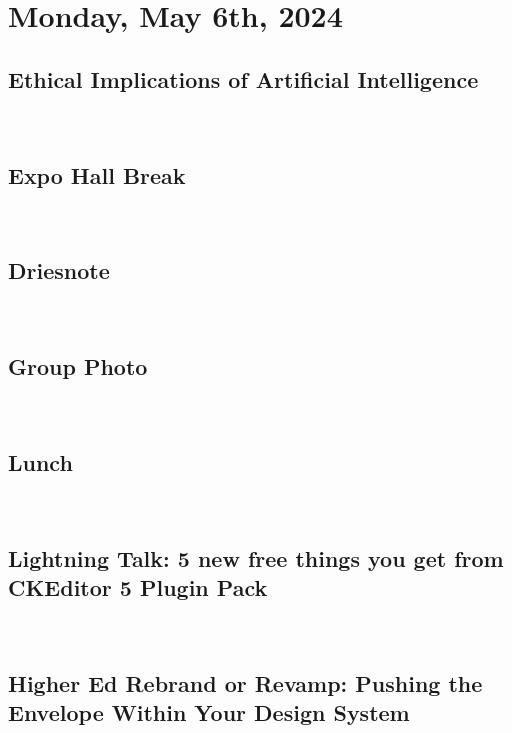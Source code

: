 \section{Monday, May 6th, 2024}\label{sec:day1}

\subsection[09:00-09:50 Ethical Implications of Artificial Intelligence]{Ethical Implications of Artificial Intelligence}\label{subsec:session1}
 \\

\subsection[09:50-10:30: Expo Hall Break]{Expo Hall Break}\label{subsec:breakd1b1}
 \\

\subsection[10:45-11:45: Driesnote]{Driesnote}\label{subsec:driesnote}
 \\

\subsection[11:45-12:00: Group Photo]{Group Photo}\label{subsec:groupphoto}
 \\

\subsection[12:00-13:00: Lunch]{Lunch}\label{subsec:lunchd1}
 \\

\subsection[13:05-13:15: Lighning Talk 5 new free things you get from CKEditor 5 Plugin Pack]{Lightning Talk: 5 new free things you get from CKEditor 5 Plugin Pack}\label{subsec:lightning1}
 \\

\subsection[13:30-14:20: Higher Ed Rebrand or Revamp: Pushing the Envelope Within Your Design System]{Higher Ed Rebrand or Revamp: Pushing the Envelope Within Your Design System}\label{subsec:session2}
 \\

